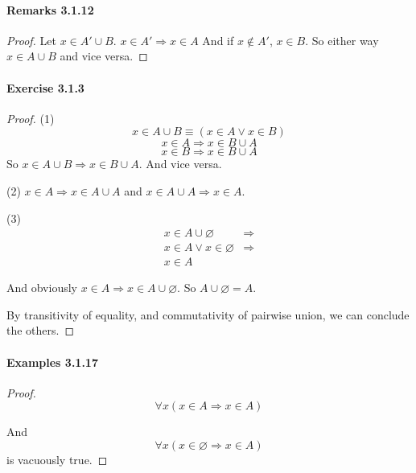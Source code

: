 \paragraph{Remarks 3.1.12}
\begin{proof}
Let $x \in A'\cup B$. $x \in A' \Longrightarrow x \in A$ And if $x \notin A'$, $x \in B$. So either way 
$x \in A\cup B$ and vice versa.
\end{proof}

\paragraph{Exercise 3.1.3} \label{exercise3.1.3}
\begin{proof}
(1)
\[
x \in A \cup B \equiv (x \in A \vee x \in B)
\]
\[
x \in A \Longrightarrow x \in B \cup A
\]
\[
x \in B \Longrightarrow x \in B \cup A
\]
So $x \in A \cup B \Longrightarrow x \in B \cup A$. And vice versa.

(2)
$x \in A \Rightarrow x \in A \cup A$ and $x \in A \cup A \Rightarrow x \in A$.

(3)
\begin{align*}
x \in A \cup \varnothing 
&\Longrightarrow \\
x \in A \vee x \in \varnothing
&\Longrightarrow \\
x \in A \tag{$\forall a, a \notin \varnothing$}
\end{align*}

And obviously $x \in A \Rightarrow x \in A \cup \varnothing$. So $A \cup \varnothing = A$.

By transitivity of equality, and commutativity of pairwise union, we can conclude the others.
\end{proof}

\paragraph{Examples 3.1.17}
\begin{proof}
\[
\forall x(x\in A \Longrightarrow x \in A)
\]

And
\[
\forall x(x \in \varnothing \Longrightarrow x \in A)
\]
is vacuously true.
\end{proof}


